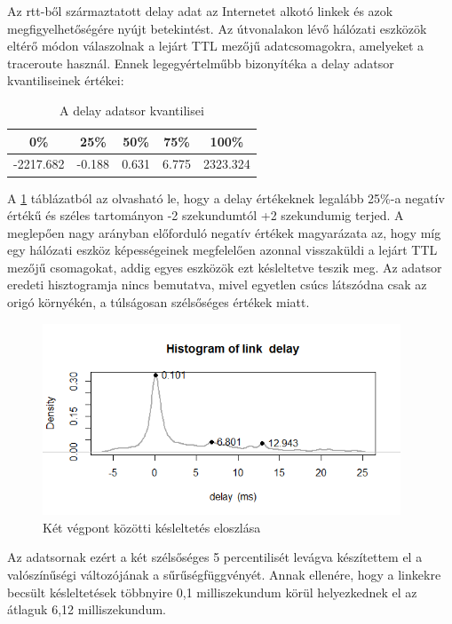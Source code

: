Az rtt-ből származtatott delay adat az Internetet alkotó linkek és azok megfigyelhetőségére nyújt betekintést. Az útvonalakon lévő hálózati eszközök eltérő módon válaszolnak a lejárt TTL mezőjű adatcsomagokra, amelyeket a traceroute használ. Ennek legegyértelműbb bizonyítéka a delay adatsor kvantiliseinek értékei:

\renewcommand{\arraystretch}{1.3}
\begin{table}[ht]
	\centering
	\caption{A delay adatsor kvantilisei}
	\hspace{2mm}
	\begin{tabular}{ | c | c | c | c | c |}
	\hline
0\% & 25\% & 50\% & 75\% & 100\% \\ \hline
-2217.682 & -0.188 & 0.631 & 6.775 & 2323.324 \\ 
\hline
	\end{tabular}
	\label{tab:delay_kvant}
\end{table}

A \ref{tab:delay_kvant} táblázatból az olvasható le, hogy a delay értékeknek legalább 25\%-a negatív értékű és széles tartományon -2 szekundumtól +2 szekundumig terjed. A meglepően nagy arányban előforduló negatív értékek magyarázata az, hogy míg egy hálózati eszköz képességeinek megfelelően azonnal visszaküldi a lejárt TTL mezőjű csomagokat, addig egyes eszközök ezt késleltetve teszik meg.
Az adatsor eredeti hisztogramja nincs bemutatva, mivel egyetlen csúcs látszódna csak az origó környékén, a túlságosan szélsőséges értékek miatt.

\begin{figure}[h!]
	\centering
	\includegraphics[width=0.95\textwidth, keepaspectratio]{figures/link-delay-dist.png}
	\caption{Két végpont közötti késleltetés eloszlása}
	\label{fig:link-delay}
\end{figure}

Az adatsornak ezért a két szélsőséges 5 percentilisét levágva készítettem el a valószínűségi változójának a sűrűségfüggvényét. Annak ellenére, hogy a linkekre becsült késleltetések többnyire 0,1 milliszekundum körül helyezkednek el az átlaguk 6,12 milliszekundum.

